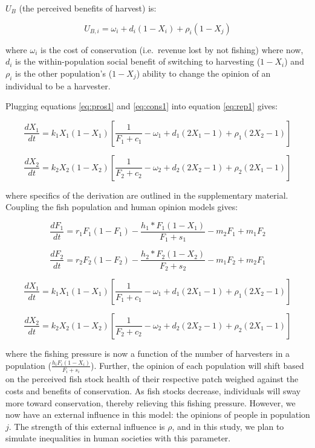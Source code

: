 \documentclass[
  12pt,
]{article}
\begin{document}
\(U_B\) (the perceived benefits of harvest) is:

\begin{equation} 
U_{B,i} = \omega_i + d_i(1-X_i) + \rho_i(1-X_j)
  \label{eq:cons1}
\end{equation}

where \(\omega_i\) is the cost of conservation (i.e.~revenue lost by not fishing) where now, \(d_i\) is the within-population social benefit of switching to harvesting (\(1-X_i\)) and \(\rho_i\) is the other population's (\(1-X_j\)) ability to change the opinion of an individual to be a harvester.

Plugging equations \eqref{eq:pros1} and \eqref{eq:cons1} into equation \eqref{eq:rep1} gives:

\begin{equation} 
\frac{dX_1}{dt} =  k_1X_1(1-X_1) [\frac{1}{F_1+c_1} - \omega_1 + d_1(2X_1 - 1) + \rho_1(2X_2 - 1)]
  \label{eq:social1}
\end{equation}

\begin{equation} 
\frac{dX_2}{dt} = k_2X_2(1-X_2)  [\frac{1}{F_2+c_2} - \omega_2 + d_2(2X_2 - 1) +  \rho_2(2X_1 - 1)]
  \label{eq:social2}
\end{equation}

where specifics of the derivation are outlined in the supplementary material. Coupling the fish population and human opinion models gives:

\begin{equation}
\frac{dF_1}{dt} = r_1F_1(1-F_1)-\frac{h_1*F_1(1-X_1)}{F_1 + s_1} -m_2F_1 + m_1F_2
  \label{eq:FishWhole1}
\end{equation}

\begin{equation}
\frac{dF_2}{dt} = r_2F_2(1-F_2)-\frac{h_2*F_2(1-X_2)}{F_2 + s_2} -m_1F_2 + m_2F_1
  \label{eq:FishWhole2}
\end{equation}

\begin{equation}
\frac{dX_1}{dt} =  k_1X_1(1-X_1) [\frac{1}{F_1+c_1} - \omega_1 + d_1(2X_1 - 1) + \rho_1(2X_2 - 1)]
  \label{eq:SocWhole1}
\end{equation}

\begin{equation}
\frac{dX_2}{dt} = k_2X_2(1-X_2)  [\frac{1}{F_2+c_2} - \omega_2 + d_2(2X_2 - 1) +  \rho_2(2X_1 - 1)]
  \label{eq:SocWhole2}
\end{equation}

where the fishing pressure is now a function of the number of harvesters in a population (\(\frac{h_iF_i(1-X_i)}{F_i + s_i}\)). Further, the opinion of each population will shift based on the perceived fish stock health of their respective patch weighed against the costs and benefits of conservation. As fish stocks decrease, individuals will sway more toward conservation, thereby relieving this fishing pressure. However, we now have an external influence in this model: the opinions of people in population \(j\). The strength of this external influence is \(\rho\), and in this study, we plan to simulate inequalities in human societies with this parameter.
\end{document}
